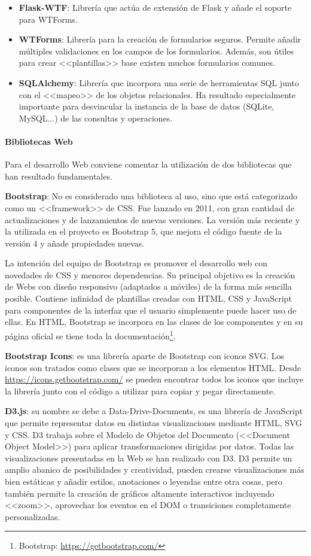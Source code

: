 \begin{itemize}
	\item \textbf{Flask-WTF}: Librería que actúa de extensión de Flask y añade
	el soporte para WTForms.
	\item \textbf{WTForms}: Librería para la creación de formularios seguros.
	Permite añadir múltiples validaciones en los campos de los formularios.
	Además, son útiles para crear <<plantillas>> base existen muchos formularios
	comunes.
	\item \textbf{SQLAlchemy}: Librería que incorpora una serie de herramientas
	SQL junto con el <<mapeo>> de los objetos relacionales. Ha resultado
	especialmente importante para desvincular la instancia de la base de datos
	(SQLite, MySQL...) de las consultas y operaciones.
\end{itemize}

\paragraph{Bibliotecas Web} Para el desarrollo Web conviene comentar la
utilización de dos bibliotecas que han resultado fundamentales.

\textbf{Bootstrap}: No es considerado una biblioteca al uso, sino que está
categorizado como un <<framework>> de CSS. Fue lanzado en 2011, con gran
cantidad de actualizaciones y de lanzamientos de nuevas versiones. La versión
más reciente y la utilizada en el proyecto es Bootstrap 5, que mejora el código
fuente de la versión 4 y añade propiedades nuevas. 

La intención del equipo de Bootstrap es promover el desarrollo web con novedades
de CSS y menores dependencias. Su principal objetivo es la creación de Webs con
diseño responsivo (adaptados a móviles) de la forma más sencilla posible.
Contiene infinidad de plantillas creadas con HTML, CSS y JavaScript para
componentes de la interfaz que el usuario simplemente puede hacer uso de ellas.
En HTML, Bootstrap se incorpora en las clases de los componentes y en su página
oficial se tiene toda la documentación\footnote{Bootstrap:
\url{https://getbootstrap.com/}}.

\textbf{Bootstrap Icons}: es una librería aparte de Bootstrap con iconos SVG.
Los iconos son tratados como clases que se incorporan a los elementos HTML.
Desde \url{https://icons.getbootstrap.com/} se pueden encontrar todos los iconos
que incluye la librería junto con el código a utilizar para copiar y pegar
directamente.

\textbf{D3.js}: su nombre se debe a Data-Drive-Documents, es una librería de
JavaScript que permite representar datos en distintas visualizaciones mediante
HTML, SVG y CSS. D3 trabaja sobre el Modelo de Objetos del Documento (<<Document
Object Model>>) para aplicar transformaciones dirigidas por datos. Todas las
visualizaciones presentadas en la Web se han realizado con D3. D3 permite un
amplio abanico de posibilidades y creatividad, pueden crearse visualizaciones
más bien estáticas y añadir estilos, anotaciones o leyendas entre otra cosas,
pero también permite la creación de gráficos altamente interactivos incluyendo
<<zoom>>, aprovechar los eventos en el DOM o transiciones completamente
personalizadas.

